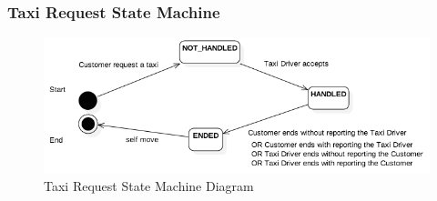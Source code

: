 \subsubsection{Taxi Request State Machine}

	\begin{figure}[H]
		\centering
		\includegraphics[width=\textwidth, scale=0.5]{IMG/StateMachineDiagrams/TaxiRequest.png}
		\caption{Taxi Request State Machine Diagram}\label{sec:FigureTaxiRequestStateMachine}
	\end{figure}